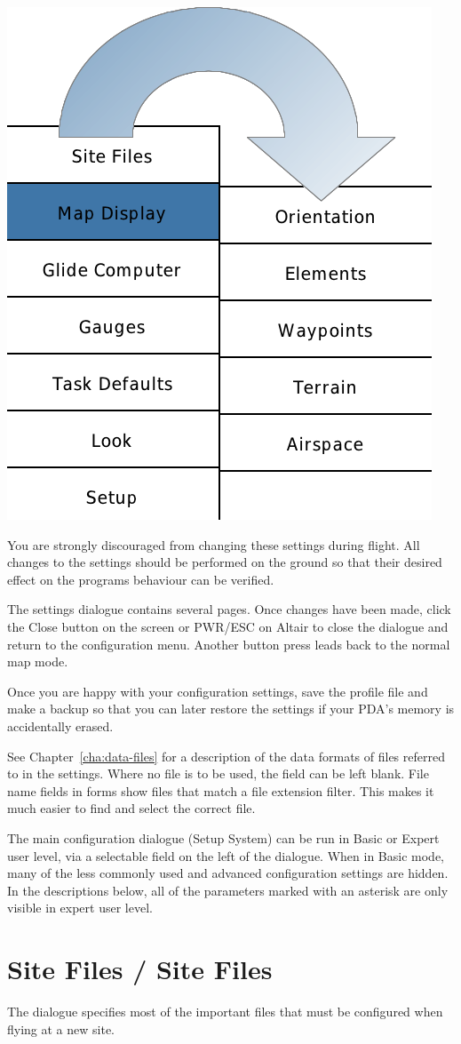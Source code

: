 \begin{center}
\includegraphics[angle=0,width=0.5\linewidth,keepaspectratio='true']{figures/config-menu.png}
\end{center}

You are strongly discouraged from changing these settings during
flight.  \warning  All changes to the settings should be performed on the ground
so that their desired effect on the programs behaviour can be
verified.

The settings dialogue contains several pages.  Once changes have been made,
click the Close button on the screen or PWR/ESC on Altair to close the dialogue
and return to the configuration menu. Another button press leads back to 
the normal map mode.

\tip Once you are happy with your configuration settings, save the
profile file and make a backup so that you can later restore the
settings if your PDA's memory is accidentally erased.

See Chapter~\ref{cha:data-files} for a description of the data formats
of files referred to in the settings.  Where no file is to be used,
the field can be left blank.  File name fields in forms show files
that match a file extension filter.  This makes it much easier to find
and select the correct file.

The main configuration dialogue (Setup System) can be run in Basic or
Expert user level, via a selectable field on the left of the dialogue.
When in Basic mode, many of the less commonly used and advanced
configuration settings are hidden.  In the descriptions below,
all of the parameters marked with an asterisk are only visible in
expert user level. 

\section{Site Files / Site Files}
The dialogue specifies most of the important files that must be
configured when flying at a new site.

